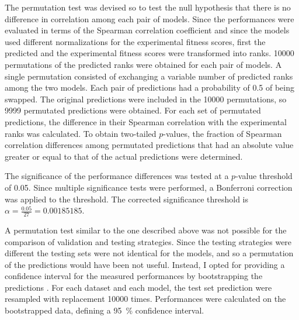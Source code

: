 The permutation test was devised so to test the null hypothesis that there is no difference in correlation among each pair of models.
Since the performances were evaluated in terms of the Spearman correlation coefficient and since the models used different normalizations for the experimental fitness scores, first the predicted and the experimental fitness scores were transformed into ranks.
\num{10000} permutations of the predicted ranks were obtained for each pair of models.
A single permutation consisted of exchanging a variable number of predicted ranks among the two models.
Each pair of predictions had a probability of \num{0.5} of being swapped.
The original predictions were included in the \num{10000} permutations, so \num{9999} permutated predictions were obtained.
For each set of permutated predictions, the difference in their Spearman correlation with the experimental ranks was calculated.
To obtain two-tailed $p$-values, the fraction of Spearman correlation differences among permutated predictions that had an absolute value greater or equal to that of the actual predictions were determined.

The significance of the performance differences was tested at a $p$-value threshold of \num{0.05}.
Since multiple significance tests were performed, a Bonferroni correction \parencite{Dunn1961} was applied to the threshold.
The corrected significance threshold is $\alpha = \frac{0.05}{27} = 0.00185185$.

A permutation test similar to the one described above was not possible for the comparison of validation and testing strategies.
Since the testing strategies were different the testing sets were not identical for the models, and so a permutation of the predictions would have been not useful.
Instead, I opted for providing a confidence interval for the measured performances by bootstrapping the predictions \parencite{Davison1999}.
For each dataset and each model, the test set prediction were resampled with replacement \num{10000} times.
Performances were calculated on the bootstrapped data, defining a \SI{95}{\percent} confidence interval.
